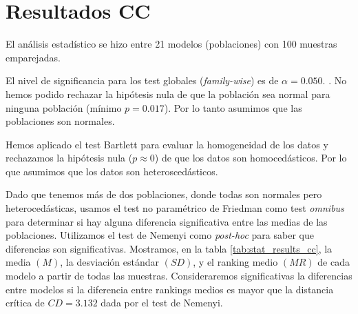 \documentclass[a4paper,oneside,11pt,leqno]{article}
\begin{document}
	\section{Resultados CC}
	\label{sec:results_cc}

	El análisis estadístico se hizo entre 21 modelos (poblaciones) con 100 muestras emparejadas.

	El nivel de significancia para los test globales (\textit{family-wise}) es de $\alpha=0.050$.
.
	No hemos podido rechazar la hipótesis nula de que la población sea normal para ninguna población (mínimo $p=0.017$). Por lo tanto asumimos que las poblaciones son normales.

	Hemos aplicado el test Bartlett para evaluar la homogeneidad de los datos y rechazamos la hipótesis nula ($p\approx 0$) de que los datos son homocedásticos. Por lo que asumimos que los datos son heteroscedásticos.

	Dado que tenemos más de dos poblaciones, donde todas son normales pero heterocedásticas, usamos el test no paramétrico de Friedman como test \textit{omnibus} para determinar si hay alguna diferencia significativa entre las medias de las poblaciones. Utilizamos el test de Nemenyi como \textit{post-hoc} para saber que diferencias son significativas. Mostramos, en la tabla \ref{tab:stat_results_cc}, la media $(M)$, la desviación estándar $(SD)$, y el ranking medio $(MR)$ de cada modelo a partir de todas las muestras. Consideraremos significativas la diferencias entre modelos si la diferencia entre rankings medios es mayor que la distancia crítica de $CD=3.132$ dada por el test de Nemenyi.
\end{document}
